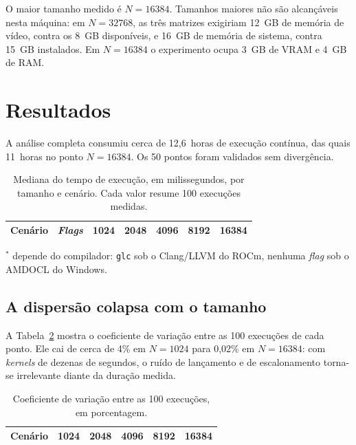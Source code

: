 \documentclass[12pt]{article}
\begin{document}
O maior tamanho medido é $N=16384$. Tamanhos maiores não são alcançáveis nesta
máquina: em $N=32768$, as três matrizes exigiriam 12~GB de memória de vídeo,
contra os 8~GB disponíveis, e 16~GB de memória de sistema, contra 15~GB
instalados. Em $N=16384$ o experimento ocupa 3~GB de VRAM e 4~GB de RAM.

\section{Resultados}

A análise completa consumiu cerca de 12,6~horas de execução contínua, das
quais 11~horas no ponto $N=16384$. Os 50 pontos foram validados sem divergência.

\begin{table}[ht]
\centering
\caption{Mediana do tempo de execução, em milissegundos, por tamanho e cenário.
Cada valor resume 100 execuções medidas.}
\label{tab:medianas}
\small
\begin{tabular}{@{}llrrrrr@{}}
\toprule
\textbf{Cenário} & \textbf{\textit{Flags}} & \textbf{1024} & \textbf{2048} &
\textbf{4096} & \textbf{8192} & \textbf{16384} \\
\midrule

\bottomrule
\end{tabular}

\vspace{2pt}
{\footnotesize $^\ast$ depende do compilador: \texttt{glc} sob o Clang/LLVM do
ROCm, nenhuma \textit{flag} sob o AMDOCL do Windows.}
\end{table}

\subsection{A dispersão colapsa com o tamanho}

A Tabela~\ref{tab:cv} mostra o coeficiente de variação entre as 100 execuções de
cada ponto. Ele cai de cerca de 4\% em $N=1024$ para 0,02\% em $N=16384$: com
\textit{kernels} de dezenas de segundos, o ruído de lançamento e de escalonamento
torna-se irrelevante diante da duração medida.

\begin{table}[ht]
\centering
\caption{Coeficiente de variação entre as 100 execuções, em porcentagem.}
\label{tab:cv}
\small
\begin{tabular}{@{}lrrrrr@{}}
\toprule
\textbf{Cenário} & \textbf{1024} & \textbf{2048} & \textbf{4096} &
\textbf{8192} & \textbf{16384} \\
\midrule

\bottomrule
\end{tabular}
\end{table}
\end{document}
